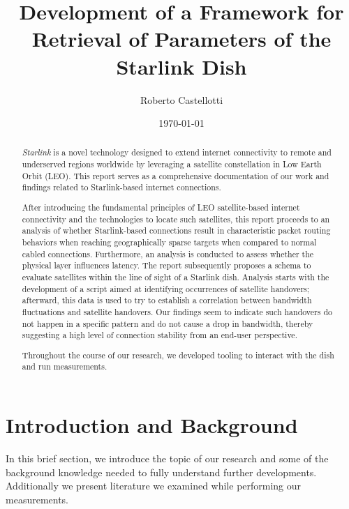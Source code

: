 \documentclass[]{report}
\title{Development of a Framework for Retrieval of Parameters of the Starlink Dish}
\author{Roberto Castellotti}
\date{\today}
\begin{document}
\maketitle
\cleardoublepage


\begin{abstract} 

\textit{Starlink} is a novel technology designed to extend internet connectivity to remote and underserved regions
worldwide by leveraging a satellite constellation in Low Earth Orbit (LEO). This report serves as a comprehensive
documentation of our work and findings related to Starlink-based internet connections.

After introducing the fundamental principles of LEO satellite-based internet connectivity and the technologies to locate
such satellites, this report proceeds to an analysis of whether Starlink-based connections result in characteristic
packet routing behaviors when reaching geographically sparse targets when compared to normal cabled connections.
Furthermore, an analysis is conducted to assess whether the physical layer influences latency. The report
subsequently proposes a schema to evaluate satellites within the line of sight of a Starlink dish. Analysis starts
with the development of a script aimed at identifying occurrences of satellite handovers; afterward, this data is
used to try to establish a correlation between bandwidth fluctuations and satellite handovers. Our findings seem to
indicate such handovers do not happen in a specific pattern and do not cause a drop in bandwidth, thereby suggesting
a high level of connection stability from an end-user perspective.
    
Throughout the course of our research, we developed tooling to interact with the dish and run measurements.

\end{abstract}
    
\tableofcontents

    
\chapter{Introduction and Background}   

In this brief section, we introduce the topic of our research and some of the background knowledge needed to fully
understand further developments. Additionally we present literature we examined while performing our measurements.
\end{document}

